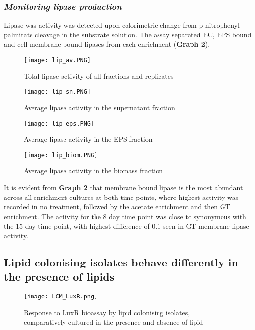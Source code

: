 \documentclass[11pt]{article}
\begin{document}
\subsubsection{\emph{Monitoring lipase production}}
Lipase was activity was detected upon colorimetric change from p-nitrophenyl palmitate cleavage in the substrate solution. The assay separated  EC, EPS bound and cell membrane bound lipases from each enrichment (\textbf{Graph 2}).

\begin{figure}
\texttt{[image: lip\_av.PNG]}
\caption{Total lipase activity of all fractions and replicates}
\end{figure}

\begin{figure}
\texttt{[image: lip\_sn.PNG]}
\caption{Average lipase activity in the supernatant fraction}
\end{figure}

\begin{figure}
\texttt{[image: lip\_eps.PNG]}
\caption{Average lipase activity in the EPS fraction}
\end{figure}

\begin{figure}
\texttt{[image: lip\_biom.PNG]}
\caption{Average lipase activity in the biomass fraction}
\end{figure}



It is evident from  \textbf{Graph 2} that membrane bound lipase is the most abundant across all enrichment cultures at both time points, where highest activity was recorded in no treatment, followed by the acetate enrichment and then GT enrichment.  The activity for the 8 day time point was close to synonymous with the 15 day time point, with highest difference of 0.1 seen in GT membrane lipase activity.

\subsection{Lipid colonising isolates behave differently in the presence of lipids}

\begin{figure}
\texttt{[image: LCM\_LuxR.png]}
\caption{Response to LuxR bioassay by lipid colonising isolates, comparatively cultured in the presence and absence of lipid }
\end{figure}
\end{document}
